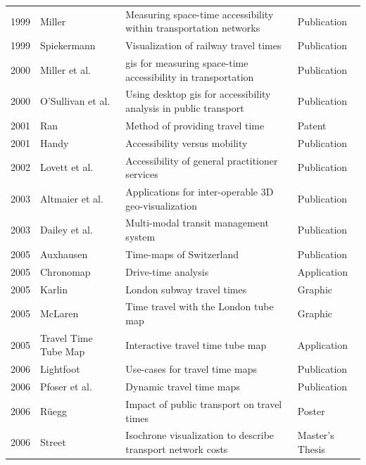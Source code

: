 \begin{table}[htp]
\begin{tabular}{r|l|l|l}
      1999 & Miller \cite{miller1999measuring} & Measuring space-time accessibility within transportation networks & Publication \\
      1999 & Spiekermann \cite{spiekermann1999visualisierung} & Visualization of railway travel times & Publication \\
      2000 & Miller et al. \cite{miller2000gis} & \acrshort{gis} for measuring space-time accessibility in transportation & Publication \\
      2000 & O'Sullivan et al. \cite{o2000using} & Using desktop \acrshort{gis} for accessibility analysis in public transport & Publication \\
      2001 & Ran \cite{ran2001method} & Method of providing travel time & Patent \\
      2001 & Handy \cite{handy2002accessibility} & Accessibility versus mobility & Publication \\
      2002 & Lovett et al. \cite{lovett2002car} & Accessibility of general practitioner services & Publication \\
      2003 & Altmaier et al. \cite{Altmaier2003} & Applications for inter-operable 3D geo-visualization & Publication \\
      2003 & Dailey et al. \cite{dailey2003design} & Multi-modal transit management system & Publication \\
      2005 & Auxhausen \cite{axhausen2005zeitkarten} & Time-maps of Switzerland & Publication \\
      2005 & Chronomap \cite{Chronomap} & Drive-time analysis & Application \\
      2005 & Karlin \cite{Karlin2005} & London subway travel times & Graphic \\
      2005 & McLaren \cite{McLaren2005} & Time travel with the London tube map & Graphic \\
      2005 & Travel Time Tube Map \cite{Carden2006} & Interactive travel time tube map & Application \\
      2006 & Lightfoot \cite{Lightfoot2006} & Use-cases for travel time maps & Publication \\
      2006 & Pfoser et al. \cite{pfoser2006dynamic} & Dynamic travel time maps & Publication \\
      2006 & Rüegg \cite{Ruegg2006} & Impact of public transport on travel times & Poster \\
      2006 & Street \cite{street2006timecontours} & Isochrone visualization to describe transport network costs & Master's Thesis \\

\end{tabular}
\end{table}
